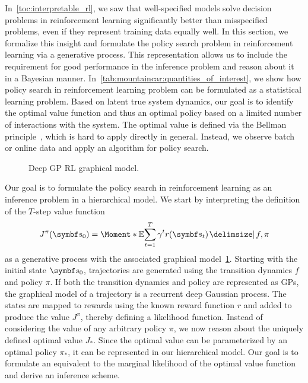 In~\cref{toc:interpretable_rl}, we saw that well-specified models solve decision problems in reinforcement learning significantly better than misspecified problems, even if they represent training data equally well.
In this section, we formalize this insight and formulate the policy search problem in reinforcement learning via a generative process.
This representation allows us to include the requirement for good performance in the inference problem and reason about it in a Bayesian manner.
In~\cref{tab:mountaincar:quantities_of_interest}, we show how policy search in reinforcement learning problem can be formulated as a statistical learning problem.
Based on latent true system dynamics, our goal is to identify the optimal value function and thus an optimal policy based on a limited number of interactions with the system.
The optimal value is defined via the Bellman principle~\parencite{sutton_reinforcement_2018}, which is hard to apply directly in general.
Instead, we observe batch or online data and apply an algorithm for policy search.

\begin{figure}[t]
    \centering
    
    \caption{
        \label{fig:mountaincar:graphical_model}
        Deep GP RL graphical model.
    }
\end{figure}
Our goal is to formulate the policy search in reinforcement learning as an inference problem in a hierarchical model.
We start by interpreting the definition of the $T$-step value function
\begin{align}
    J^\pi(\mat{s}_0) = \Moment*{\E}{\sum_{t=1}^T \gamma^t r(\mat{s}_t) \given f, \pi}
\end{align}
as a generative process with the associated graphical model~\cref{fig:mountaincar:graphical_model}.
Starting with the initial state $\mat{s}_0$, trajectories are generated using the transition dynamics $f$ and policy $\pi$.
If both the transition dynamics and policy are represented as GPs, the graphical model of a trajectory is a recurrent deep Gaussian process.
The states are mapped to rewards using the known reward function $r$ and added to produce the value $J^\pi$, thereby defining a likelihood function.
Instead of considering the value of any arbitrary policy $\pi$, we now reason about the uniquely defined optimal value $J_\ast$.
Since the optimal value can be parameterized by an optimal policy $\pi_\ast$, it can be represented in our hierarchical model.
Our goal is to formulate an equivalent to the marginal likelihood of the optimal value function and derive an inference scheme.

